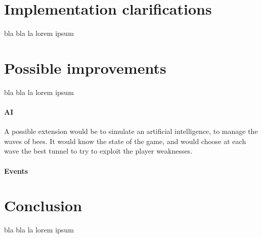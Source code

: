 \documentclass[a4paper]{article}
\begin{document}
\section{Implementation clarifications}
bla bla la lorem ipsum

\section{Possible improvements}
bla bla la lorem ipsum


\paragraph{AI} A possible extension would be to simulate an artificial intelligence, to manage the waves of bees. It would know the state of the game, and would choose at each wave the best tunnel to try to exploit the player weaknesses.

\paragraph{Events}


\section*{Conclusion}
bla bla la lorem ipsum
\end{document}
